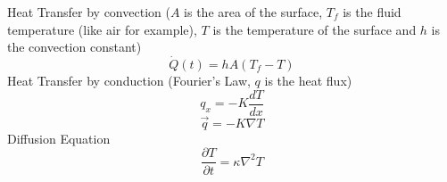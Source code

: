 \documentclass{article}
\begin{document}
Heat Transfer by convection ($A$ is the area of the surface, $T_f$ is the fluid temperature (like air for example), $T$ is the temperature of the surface and $h$ is the convection constant)
\begin{equation}
  \dot{Q}(t) = hA(T_f - T)
\end{equation}
Heat Transfer by conduction (Fourier's Law, $q$ is the heat flux)
\begin{equation}
  q_x = -K\frac{dT}{dx}
\end{equation}
\begin{equation}
  \vec{q} = -K\nabla T
\end{equation}
Diffusion Equation
\begin{equation}
  \frac{\partial T}{\partial t} = \kappa \nabla^2T
\end{equation}
\end{document}

